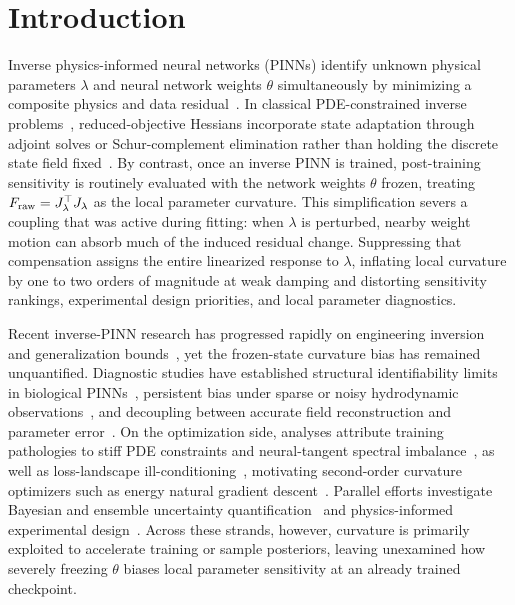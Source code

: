 \documentclass[preprint,11pt]{elsarticle}
\newcommand{\Fraw}{F_{\mathrm{raw}}}
\begin{document}
\linenumbers

\section{Introduction}
\label{sec:introduction}

Inverse physics-informed neural networks (PINNs) identify unknown physical parameters $\lambda$ and neural network weights $\theta$ simultaneously by minimizing a composite physics and data residual~\cite{raissi2019physics,karniadakis2021piml}.
In classical PDE-constrained inverse problems~\cite{hinze2009optimization}, reduced-objective Hessians incorporate state adaptation through adjoint solves or Schur-complement elimination rather than holding the discrete state field fixed~\cite{biros2005parallel,buithanh2013computational}.
By contrast, once an inverse PINN is trained, post-training sensitivity is routinely evaluated with the network weights $\theta$ frozen, treating $\Fraw=\Jl^\top\Jl$ as the local parameter curvature.
This simplification severs a coupling that was active during fitting: when $\lambda$ is perturbed, nearby weight motion can absorb much of the induced residual change.
Suppressing that compensation assigns the entire linearized response to $\lambda$, inflating local curvature by one to two orders of magnitude at weak damping and distorting sensitivity rankings, experimental design priorities, and local parameter diagnostics.

Recent inverse-PINN research has progressed rapidly on engineering inversion~\cite{haghighat2021physics} and generalization bounds~\cite{mishra2022inverse}, yet the frozen-state curvature bias has remained unquantified.
Diagnostic studies have established structural identifiability limits in biological PINNs~\cite{kharazmi2021identifiability}, persistent bias under sparse or noisy hydrodynamic observations~\cite{radfar2026sparse}, and decoupling between accurate field reconstruction and parameter error~\cite{zhang2026beyond}.
On the optimization side, analyses attribute training pathologies to stiff PDE constraints and neural-tangent spectral imbalance~\cite{krishnapriyan2021characterizing,wang2022ntk}, as well as loss-landscape ill-conditioning~\cite{rathore2024loss}, motivating second-order curvature optimizers such as energy natural gradient descent~\cite{muller2023engd}.
Parallel efforts investigate Bayesian and ensemble uncertainty quantification~\cite{yang2021bpinns,pensoneault2024eki} and physics-informed experimental design~\cite{hemachandra2025pied}.
Across these strands, however, curvature is primarily exploited to accelerate training or sample posteriors, leaving unexamined how severely freezing $\theta$ biases local parameter sensitivity at an already trained checkpoint.
\end{document}
